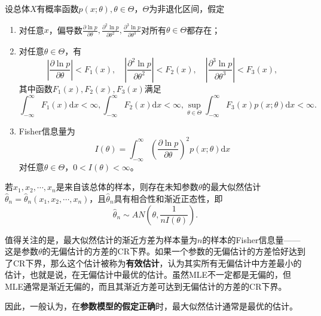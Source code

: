 \begin{theorem}
    设总体$X$有概率函数$p(x;\theta),\theta\in \Theta$，$\Theta$为非退化区间，假定
    \begin{enumerate}
        \item 对任意$x$，偏导数$\frac{\partial \ln p}{\partial \theta}, \frac{\partial^2 \ln p}{\partial \theta^2}, \frac{\partial^3 \ln p}{\partial \theta^3}$对所有$\theta \in \Theta$都存在；
        \item 对任意$\theta \in \Theta$，有
        $$
        \left|\frac{\partial \ln p}{\partial \theta}  \right| < F_1(x),\quad \left|\frac{\partial^2 \ln p}{\partial \theta^2}  \right| < F_2(x), \quad 
        \left|\frac{\partial^3 \ln p}{\partial \theta^3}  \right| < F_3(x),
        $$
        其中函数$F_1(x),F_2(x),F_3(x)$满足
        $$
        \int_{-\infty}^{\infty} F_1(x) \text{d} x < \infty, \int_{-\infty}^{\infty} F_2(x) \text{d} x < \infty, \sup_{\theta \in \Theta} \int_{-\infty}^{\infty} F_3(x) p(x;\theta)\text{d} x < \infty.
         $$
        \item Fisher信息量为
        $$
        I(\theta) = \int_{-\infty}^{\infty} \left(\frac{\partial \ln p}{\partial \theta}\right)^2 p(x;\theta) \text{d}x
        $$
        对任意$\theta \in \Theta$，$0<I(\theta)<\infty$。
    \end{enumerate}
    若$x_1,x_2,\cdots,x_n$是来自该总体的样本，则存在未知参数$\theta$的最大似然估计$\hat{\theta}_n = \hat{\theta}_n(x_1,x_2,\cdots,x_n)$，且$\hat{\theta}_n$具有相合性和渐近正态性，即
    $$
    \hat{\theta}_n \sim AN \left(\theta,\frac{1}{nI(\theta)}\right).
    $$
\end{theorem}
\begin{remark}
    值得关注的是，最大似然估计的渐近方差为样本量为$n$的样本的Fisher信息量——这是参数$\theta$的无偏估计的方差的CR下界。如果一个参数的无偏估计的方差恰好达到了CR下界，那么这个估计被称为\textbf{有效估计}，认为其实所有无偏估计中方差最小的估计，也就是说，在无偏估计中最优的估计。虽然MLE不一定都是无偏的，但MLE通常是渐近无偏的，而且其渐近方差可达到无偏估计的方差的CR下界。

    因此，一般认为，在\textbf{参数模型的假定正确}时，最大似然估计通常是最优的估计。
\end{remark}

